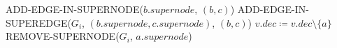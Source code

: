 \begin{algorithm}[H]
\begin{algorithmic}[1]
                    \EndIf
                        \State ADD-EDGE-IN-SUPERNODE($b.supernode$, $(b,c)$)
                    \Else
                        \State ADD-EDGE-IN-SUPEREDGE($G_i$, $(b.supernode, c.supernode)$, $(b,c)$)
                    \EndIf
                \EndIf
            \EndFor
        \EndFor
                \State $v.dec \coloneqq v.dec \setminus \{a\}$
            \EndFor
                \State REMOVE-SUPERNODE($G_i$, $a.supernode$)
            \EndIf
        \EndFor
    \end{algorithmic}
\end{algorithm}
